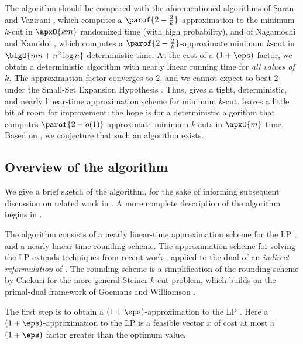 \documentclass[11pt]{article}
\numberwithin{equation}{section}
\theoremstyle{definition}
\theoremstyle{plain}
\begin{document}
The algorithm should be compared with the aforementioned algorithms of
Saran and Vazirani \cite{sv-95}, which computes a
$\parof{2 - \frac{2}{k}}$-approximation to the minimum $k$-cut in
$\apxO{k m}$ randomized time (with high probability), and of Nagamochi
and Kamidoi \cite{nk}, which computes a
$\parof{2- \frac{2}{k}}$-approximate minimum $k$-cut in
\begin{math}
  \bigO{mn + n^2 \log n}
\end{math}
deterministic time. At the cost of a
%
$(1+\eps)$  %
factor,
we obtain a deterministic algorithm with nearly linear running time
for \emph{all values of $k$.} The approximation factor converges to
$2$, and we cannot expect to beat 2 under the
%
Small-Set Expansion Hypothesis   %
\cite{manurangsi-17}. Thus,  gives a
tight, deterministic, and
%
nearly linear-time %
approximation scheme for
minimum  %
$k$-cut.  leaves a little bit of room for
improvement: the hope is for a deterministic algorithm that computes
$\parof{2 - o(1)}$-approximate minimum $k$-cuts in $\apxO{m}$
time. Based on , we conjecture that such an
algorithm exists.

\subsection{Overview of the algorithm}

We give a brief sketch of the algorithm, for the sake of informing
subsequent discussion on related work in . A
more complete description of the algorithm begins
%
%
in .

The algorithm consists of a nearly %
linear-time  %
approximation scheme
for the LP , and a nearly %
linear-time  %
rounding
scheme. The approximation scheme for solving the LP extends techniques
from recent work \cite{cq-17-soda}, applied to the dual of an
\emph{indirect reformulation} of . The rounding scheme
is a simplification of the rounding scheme by Chekuri \etal \cite{cgn-06}
for the more general Steiner $k$-cut problem, which builds on the
primal-dual framework of Goemans and Williamson \cite{gw-95}.

The first step is to obtain a
%
$(1+\eps)$-approximation
to the LP . Here a
%
$(1+\eps)$-approximation
to the LP  is a feasible vector $x$ of
cost at most a %
$(1+\eps)$  %
factor greater than the
optimum value.
\end{document}
